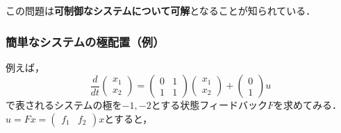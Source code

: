 この問題は{\bf 可制御なシステムについて可解}となることが知られている．

\subsubsection{簡単なシステムの極配置（例）}

例えば，
\begin{equation}
 \frac{d}{dt}
 \left(
 \begin{array}{c}
  x_1 \\
  x_2
 \end{array}
 \right) =
 \left(
 \begin{array}{cc}
  0 & 1\\
  1 & 1
 \end{array}
 \right)
 \left(
 \begin{array}{c}
  x_1 \\
  x_2
 \end{array}
 \right) +
 \left(
 \begin{array}{c}
  0 \\
  1
 \end{array}
 \right) u
\end{equation}
で表されるシステムの極を$-1, -2$とする状態フィードバック$F$を求めてみる．
$u = Fx = (\begin{array}{cc}f_1 & f_2\end{array})x$とすると，
